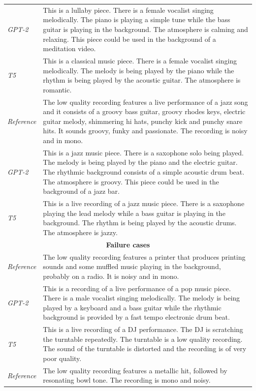 \begin{table}[t]
\begin{tabularx}{\textwidth}{lX}
\emph{GPT-2} & This is a lullaby piece. There is a female vocalist singing melodically. The piano is playing a simple tune while the bass guitar is playing in the background. The atmosphere is calming and relaxing. This piece could be used in the background of a meditation video. \\
\emph{T5} & This is a classical music piece. There is a female vocalist singing melodically. The melody is being played by the piano while the rhythm is being played by the acoustic guitar. The atmosphere is romantic. \\
\midrule
\addlinespace[2pt]
\emph{Reference} & The low quality recording features a live performance of a jazz song and it consists of a groovy bass guitar, groovy rhodes keys, electric guitar melody, shimmering hi hats, punchy kick and punchy snare hits. It sounds groovy, funky and passionate. The recording is noisy and in mono. \\
\emph{GPT-2} & This is a jazz music piece. There is a saxophone solo being played. The melody is being played by the piano and the electric guitar. The rhythmic background consists of a simple acoustic drum beat. The atmosphere is groovy. This piece could be used in the background of a jazz bar. \\
\emph{T5} & This is a live recording of a jazz music piece. There is a saxophone playing the lead melody while a bass guitar is playing in the background. The rhythm is being played by the acoustic drums. The atmosphere is jazzy. \\
\midrule
\multicolumn{2}{c}{\textbf{Failure cases}}\\
\midrule
\addlinespace[2pt]
\emph{Reference} & The low quality recording features a printer that produces printing sounds and some muffled music playing in the background, probably on a radio. It is noisy and in mono. \\
\emph{GPT-2} & This is a recording of a live performance of a pop music piece. There is a male vocalist singing melodically. The melody is being played by a keyboard and a bass guitar while the rhythmic background is provided by a fast tempo electronic drum beat. \\
\emph{T5} & This is a live recording of a DJ performance. The DJ is scratching the turntable repeatedly. The turntable is a low quality recording. The sound of the turntable is distorted and the recording is of very poor quality. \\
\midrule
\addlinespace[2pt]
\emph{Reference} & The low quality recording features a metallic hit, followed by resonating bowl tone. The recording is mono and noisy. \\

\end{tabularx}
\end{table}
